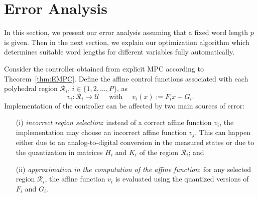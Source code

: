 \section{Error Analysis}
\label{sec:Error_Analysis}

In this section, we present our error analysis assuming that a fixed word length $p$ is given.
Then in the next section, we explain our optimization algorithm which determines suitable word
lengths for different variables fully automatically. %
%

Consider the controller obtained from explicit MPC according to Theorem~\ref{thm:EMPC}.
Define the affine control functions associated with each polyhedral region $\mathcal R_i$, $i\in\{1,2,\ldots, P\}$, as
$$v_{i}:\mathcal R_i\rightarrow \mathcal U \quad \text{ with } \quad v_{i}(x) := F_i x + G_i.$$
Implementation of the controller can be affected by two main sources of
error:
\begin{itemize}
  \item[(i)] \emph{incorrect region selection}:
   instead of a correct affine function $v_{i}$, the implementation may choose an incorrect affine function $v_{j}$. This can happen either
    due to an analog-to-digital conversion in the measured states or due to the quantization in matrices $H_i$ and $K_i$ of the region $\mathcal R_i$; and
    
  \item[(ii)] \emph{approximation in the computation of the affine function}: for any selected region $\mathcal R_i$, the affine function $v_{i}$ is evaluated using the quantized versions of $F_i$ and $G_i$.
\end{itemize}


